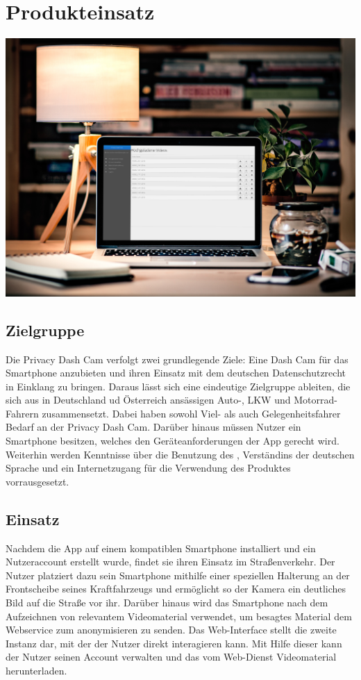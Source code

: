 \chapter{Produkteinsatz}

\includegraphics[width=\textwidth]{subtopicsFuncspec/Res/Mockups/Webinterface_desktop.jpg}

\section{Zielgruppe}
Die Privacy Dash Cam verfolgt zwei grundlegende Ziele: Eine Dash Cam für das \gls{Smartphone} anzubieten und ihren Einsatz mit dem deutschen Datenschutzrecht in Einklang zu bringen. Daraus lässt sich eine eindeutige Zielgruppe ableiten, die sich aus in Deutschland ud Österreich ansässigen Auto-, LKW und Motorrad-Fahrern zusammensetzt. Dabei haben sowohl Viel- als auch Gelegenheitsfahrer Bedarf an der Privacy Dash Cam. Darüber hinaus müssen Nutzer ein \gls{Smartphone} besitzen, welches den Geräteanforderungen der \gls{App} gerecht wird. Weiterhin werden Kenntnisse über die Benutzung des , Verständins der deutschen Sprache und ein Internetzugang für die Verwendung des Produktes vorrausgesetzt.

\section{Einsatz}
Nachdem die \gls{App} auf einem kompatiblen \gls{Smartphone} installiert und ein Nutzeraccount erstellt wurde, findet sie ihren Einsatz im Straßenverkehr. Der Nutzer platziert dazu sein \gls{Smartphone} mithilfe einer speziellen Halterung an der Frontscheibe seines Kraftfahrzeugs und ermöglicht so der Kamera ein deutliches Bild auf die Straße vor ihr. Darüber hinaus wird das \gls{Smartphone} nach dem Aufzeichnen von relevantem Videomaterial verwendet, um besagtes Material dem Webservice zum \gls{anonymisieren} zu senden.\newline
Das Web-Interface stellt die zweite Instanz dar, mit der der Nutzer direkt interagieren kann. Mit Hilfe dieser kann der Nutzer seinen Account verwalten und das vom \gls{Web-Dienst}  Videomaterial herunterladen.

